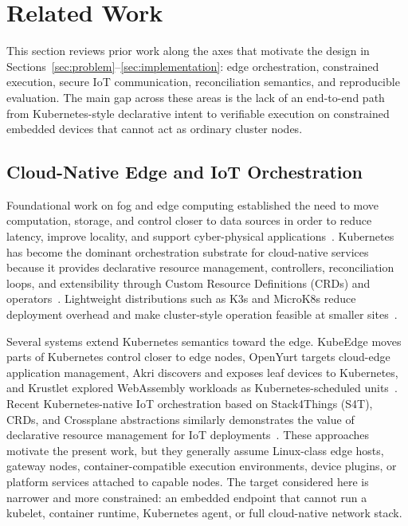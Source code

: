 \section{Related Work}\label{sec:related-work}

This section reviews prior work along the axes that motivate the design in Sections~\ref{sec:problem}--\ref{sec:implementation}: edge orchestration, constrained execution, secure IoT communication, reconciliation semantics, and reproducible evaluation. The main gap across these areas is the lack of an end-to-end path from Kubernetes-style declarative intent to verifiable execution on constrained embedded devices that cannot act as ordinary cluster nodes.

\subsection{Cloud-Native Edge and IoT Orchestration}
Foundational work on fog and edge computing established the need to move computation, storage, and control closer to data sources in order to reduce latency, improve locality, and support cyber-physical applications~\cite{bonomi_fog,shi_edge,satyanarayanan_edge,chiang_fog}. Kubernetes has become the dominant orchestration substrate for cloud-native services because it provides declarative resource management, controllers, reconciliation loops, and extensibility through Custom Resource Definitions (CRDs) and operators~\cite{kubernetes,kubernetes_operators}. Lightweight distributions such as K3s and MicroK8s reduce deployment overhead and make cluster-style operation feasible at smaller sites~\cite{k3s,microk8s}.

Several systems extend Kubernetes semantics toward the edge. KubeEdge moves parts of Kubernetes control closer to edge nodes, OpenYurt targets cloud-edge application management, Akri discovers and exposes leaf devices to Kubernetes, and Krustlet explored WebAssembly workloads as Kubernetes-scheduled units~\cite{kubeedge,openyurt,akri,krustlet}. Recent Kubernetes-native IoT orchestration based on Stack4Things (S4T), CRDs, and Crossplane abstractions similarly demonstrates the value of declarative resource management for IoT deployments~\cite{dagati_iot_orchestration_s4t}. These approaches motivate the present work, but they generally assume Linux-class edge hosts, gateway nodes, container-compatible execution environments, device plugins, or platform services attached to capable nodes. The target considered here is narrower and more constrained: an embedded endpoint that cannot run a kubelet, container runtime, Kubernetes agent, or full cloud-native network stack.

